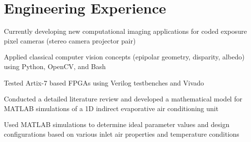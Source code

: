 \hfill
%
%
\begin{minipage}[t]{0.66\textwidth} %


 \section{Engineering Experience}

 \vspace{\topsep} %
 \begin{tightitemize}
  \item Currently developing new computational imaging applications for coded exposure pixel cameras (stereo camera projector pair)
  \item Applied classical computer vision concepts (epipolar geometry, disparity, albedo) using Python, OpenCV, and Bash
  \item Tested Artix-7 based FPGAs using Verilog testbenches and Vivado
 \end{tightitemize}

 \sectionspace %


 \begin{tightitemize}
  \item Conducted a detailed literature review and developed a mathematical model for MATLAB simulations of a 1D indirect evaporative air conditioning unit
  \item Used MATLAB simulations to determine ideal parameter values and design configurations based on various inlet air properties and temperature conditions
 \end{tightitemize}

 \sectionspace %



\end{minipage}
